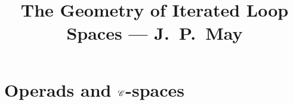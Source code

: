 \documentclass[11pt]{article}
\title{The Geometry of Iterated Loop Spaces\small{ --- J.\ P.\ May}}
\author{}
\date{}
\begin{document}

\section{Operads and \texorpdfstring{$\mathscr{C}$}{C}-spaces}
\end{document}
